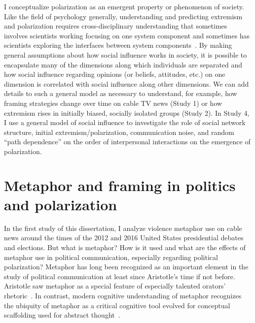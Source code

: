 I conceptualize polarization as an emergent property or phenomenon of society. 
Like the field of psychology generally, understanding and predicting extremism
and polarization requires cross-disciplinary understanding that sometimes
involves scientists working focusing on one system component and sometimes has 
scientists exploring the interfaces between system components~\cite{Brewer2013,Rollwage2019}.
By making general assumptions about how social influence works in society, it is
possible to encapsulate many of the dimensions along which individuals are
separated and how social influence regarding opinions 
(or beliefs, attitudes, etc.) on one dimension
is correlated with social influence along other dimensions. We can add 
details to such a general model as necessary to understand, for example, 
how framing strategies change over time on cable TV news (Study 1) or how
extremism rises in initially biased, socially isolated groups (Study 2). 
In Study 4, I use a general model of social influence to 
investigate the role of social network structure, initial extremism/polarization,
communication noise, and random ``path dependence'' on the order of 
interpersonal interactions on the emergence of polarization.


\section{Metaphor and framing in politics and polarization}

In the first study of this dissertation, I analyze violence metaphor use on
cable news around the times of the 2012 and 2016 United States presidential
debates and elections. But what is metaphor? How is it used and what are the
effects of metaphor use in political communication, especially regarding
political polarization? Metaphor has long been recognized as an important 
element in the study of political 
communication at least since Aristotle's time if not before.
Aristotle saw metaphor as a special 
feature of especially talented orators' rhetoric~\cite{Aristotle1965,Kirby1997}. 
In contrast, modern cognitive understanding of metaphor recognizes the
ubiquity of metaphor as a critical cognitive tool evolved for 
conceptual scaffolding used for abstract 
thought~\cite{Lakoff1980,Heyes2018a,HeyesCognitiveGadgets}.  

